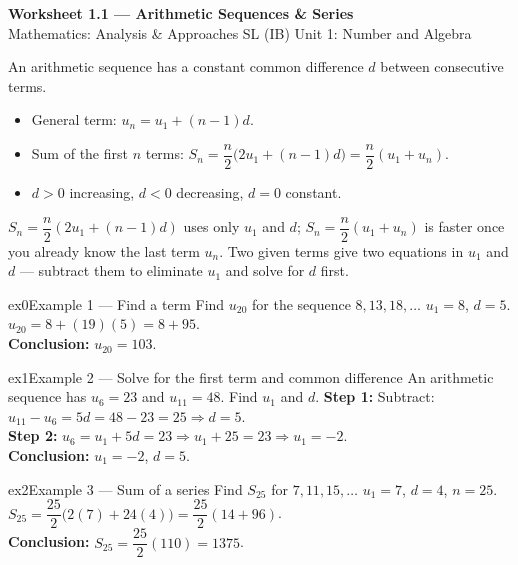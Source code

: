 \documentclass[11pt]{article}
\begin{document}
\begin{center}
{\LARGE\bfseries\color{titleblue}Worksheet 1.1 --- Arithmetic Sequences \& Series}\\[2pt]
{\small Mathematics: Analysis \& Approaches SL (IB) \textperiodcentered{} Unit 1: Number and Algebra}
\end{center}

\begin{ideabox}
An arithmetic sequence has a constant common difference $d$ between consecutive terms.
\begin{itemize}[leftmargin=*,itemsep=2pt]
  \item General term: $u_n=u_1+(n-1)d$.
  \item Sum of the first $n$ terms: $S_n=\dfrac n2\big(2u_1+(n-1)d\big)=\dfrac n2(u_1+u_n)$.
  \item $d>0$ increasing, $d<0$ decreasing, $d=0$ constant.
\end{itemize}
\end{ideabox}

\begin{learnbox}
$S_n=\dfrac n2(2u_1+(n-1)d)$ uses only $u_1$ and $d$; $S_n=\dfrac n2(u_1+u_n)$ is faster once you already know the last term $u_n$.
Two given terms give two equations in $u_1$ and $d$ --- subtract them to eliminate $u_1$ and solve for $d$ first.
\end{learnbox}


\begin{example}{ex0}{Example 1 --- Find a term}
Find $u_{20}$ for the sequence $8,13,18,\dots$\soln
$u_1=8$, $d=5$. $u_{20}=8+(19)(5)=8+95$.\\[3pt]
\textbf{Conclusion:} $u_{20}=103$.
\end{example}

\begin{example}{ex1}{Example 2 --- Solve for the first term and common difference}
An arithmetic sequence has $u_6=23$ and $u_{11}=48$. Find $u_1$ and $d$.\soln
\textbf{Step 1:} Subtract: $u_{11}-u_6=5d=48-23=25\Rightarrow d=5$.\\[3pt]
\textbf{Step 2:} $u_6=u_1+5d=23\Rightarrow u_1+25=23\Rightarrow u_1=-2$.\\[3pt]
\textbf{Conclusion:} $u_1=-2$, $d=5$.
\end{example}

\begin{example}{ex2}{Example 3 --- Sum of a series}
Find $S_{25}$ for $7,11,15,\dots$\soln
$u_1=7$, $d=4$, $n=25$. $S_{25}=\dfrac{25}{2}\big(2(7)+24(4)\big)=\dfrac{25}{2}(14+96)$.\\[3pt]
\textbf{Conclusion:} $S_{25}=\dfrac{25}{2}(110)=1375$.
\end{example}
\end{document}
